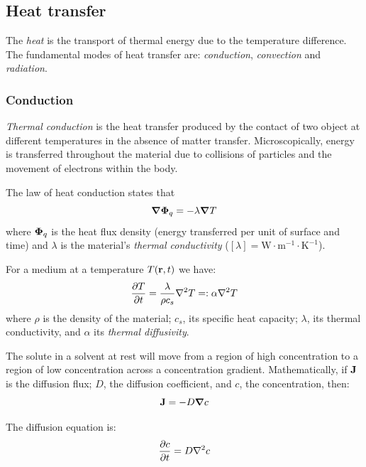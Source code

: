 \documentclass[../../../main.tex]{subfiles}
\begin{document}
\begin{multicols}{2}
  \subsection{Heat transfer}
  \begin{definition}[Heat]
    The \textit{heat} is the transport of thermal energy due to the temperature difference. The fundamental modes of heat transfer are: \textit{conduction}, \textit{convection} and \textit{radiation}.
  \end{definition}
  \subsubsection{Conduction}
  \begin{definition}[Conduction]
    \textit{Thermal conduction} is the heat transfer produced by the contact of two object at different temperatures in the absence of matter transfer. Microscopically, energy is transferred throughout the material due to collisions of particles and the movement of electrons within the body.
  \end{definition}
  \begin{law}
    The law of heat conduction states that
    $$\grad\boldsymbol{\mathrm{\Phi}}_q=-\lambda\grad T$$ where $\boldsymbol{\mathrm{\Phi}}_q$ is the heat flux density (energy transferred per unit of surface and time) and $\lambda$ is the material's \textit{thermal conductivity} ($[\lambda]=\text{W}\cdot\text{m}^{-1}\cdot\text{K}^{-1}$).
  \end{law}
  \begin{prop}
    For a medium at a temperature $T(\boldsymbol{\mathrm{r}},t)$ we have:
    $$\pdv{T}{t}=\frac{\lambda}{\rho c_s}\laplacian T=:\alpha\laplacian T$$
    where $\rho$ is the density of the material; $c_s$, its specific heat capacity; $\lambda$, its thermal conductivity, and $\alpha$ its \textit{thermal diffusivity}.
  \end{prop}
  \begin{law}
    The solute in a solvent at rest will move from a region of high concentration to a region of low concentration across a concentration gradient. Mathematically, if $\boldsymbol{\mathrm{J}}$ is the diffusion flux; $D$, the diffusion coefficient, and $c$, the concentration, then:
    $$\boldsymbol{\mathrm{J}}=-D\grad c$$
  \end{law}
  \begin{prop}
    The diffusion equation is: $$\pdv{c}{t}=D\laplacian c$$

\end{prop}
\end{multicols}
\end{document}
